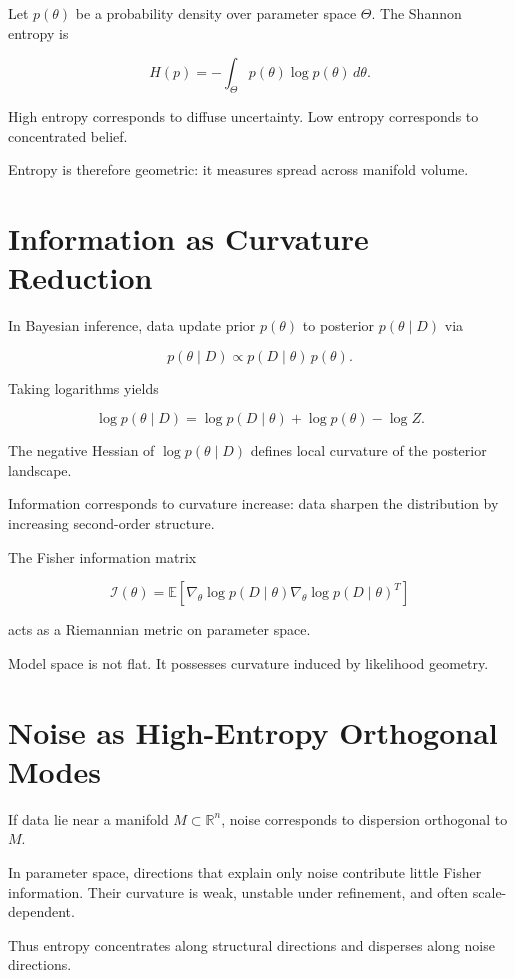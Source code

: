 \documentclass[12pt]{book}
\begin{document}
Let $p(\theta)$ be a probability density over parameter space $\Theta$. The Shannon entropy is

\[
H(p) = - \int_{\Theta} p(\theta) \log p(\theta)\, d\theta.
\]

High entropy corresponds to diffuse uncertainty. Low entropy corresponds to concentrated belief.

Entropy is therefore geometric: it measures spread across manifold volume.

\section{Information as Curvature Reduction}

In Bayesian inference, data update prior $p(\theta)$ to posterior $p(\theta \mid D)$ via

\[
p(\theta \mid D) \propto p(D \mid \theta)\, p(\theta).
\]

Taking logarithms yields

\[
\log p(\theta \mid D)
=
\log p(D \mid \theta)
+
\log p(\theta)
-
\log Z.
\]

The negative Hessian of $\log p(\theta \mid D)$ defines local curvature of the posterior landscape.

Information corresponds to curvature increase: data sharpen the distribution by increasing second-order structure.

The Fisher information matrix

\[
\mathcal{I}(\theta)
=
\mathbb{E}
\left[
\nabla_\theta \log p(D \mid \theta)
\nabla_\theta \log p(D \mid \theta)^T
\right]
\]

acts as a Riemannian metric on parameter space.

Model space is not flat. It possesses curvature induced by likelihood geometry.

\section{Noise as High-Entropy Orthogonal Modes}

If data lie near a manifold $M \subset \mathbb{R}^n$, noise corresponds to dispersion orthogonal to $M$.

In parameter space, directions that explain only noise contribute little Fisher information. Their curvature is weak, unstable under refinement, and often scale-dependent.

Thus entropy concentrates along structural directions and disperses along noise directions.
\end{document}

